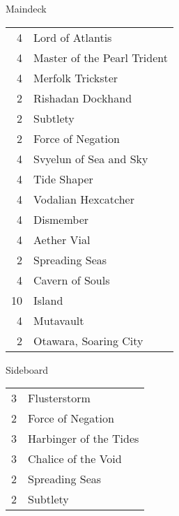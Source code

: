 \documentclass[fontsize=12pt,paper=a4]{scrartcl}
\newenvironment{decklist}{%
    \begin{tabular}{>{\hspace{-4pt}}r<{\hspace{-3pt}}>{\hspace{-3pt}}l<{\hspace{-4pt}}}
    }{%
    \end{tabular}
    \par
}
\newcommand{\card}[2]{#1 & #2\\}
\begin{document}
\begin{multicols}{2}
    \begin{Large}
        Maindeck\par
    \end{Large}
    \large
    \begin{decklist}
        \card{4}{Lord of Atlantis}
        \card{4}{Master of the Pearl Trident}
        \card{4}{Merfolk Trickster}
        \card{2}{Rishadan Dockhand}
        \card{2}{Subtlety}
        \card{2}{Force of Negation}
        \card{4}{Svyelun of Sea and Sky}
        \card{4}{Tide Shaper}
        \card{4}{Vodalian Hexcatcher}
        \card{4}{Dismember}
        \card{4}{Aether Vial}
        \card{2}{Spreading Seas}
        \card{4}{Cavern of Souls}
        \card{10}{Island}
        \card{4}{Mutavault}
        \card{2}{Otawara, Soaring City}
    \end{decklist}

    \begin{Large}
        Sideboard\par
    \end{Large}
    \begin{decklist}
        \card{3}{Flusterstorm}
        \card{2}{Force of Negation}
        \card{3}{Harbinger of the Tides}
        \card{3}{Chalice of the Void}
        \card{2}{Spreading Seas}
        \card{2}{Subtlety}
    \end{decklist}
\end{multicols}


\end{document}

